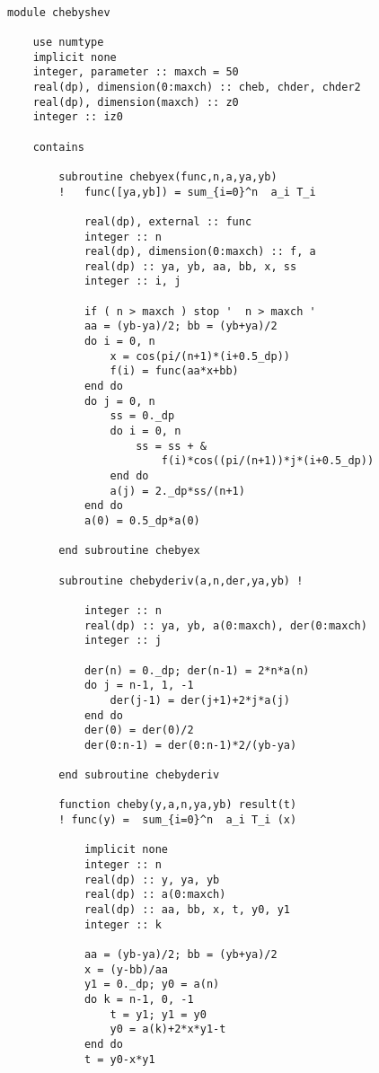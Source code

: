 \documentclass[12pt]{article}
\begin{document}
\begin{lstlisting}[frame=single,caption={{\tt cheby.f90}},label=cheby]

module chebyshev

	use numtype
	implicit none
	integer, parameter :: maxch = 50
	real(dp), dimension(0:maxch) :: cheb, chder, chder2
	real(dp), dimension(maxch) :: z0
	integer :: iz0
	
	contains
        
        subroutine chebyex(func,n,a,ya,yb) 
        !   func([ya,yb]) = sum_{i=0}^n  a_i T_i
    
            real(dp), external :: func
            integer :: n
            real(dp), dimension(0:maxch) :: f, a
            real(dp) :: ya, yb, aa, bb, x, ss
            integer :: i, j
    
            if ( n > maxch ) stop '  n > maxch '
            aa = (yb-ya)/2; bb = (yb+ya)/2
            do i = 0, n
                x = cos(pi/(n+1)*(i+0.5_dp))
                f(i) = func(aa*x+bb)
            end do
            do j = 0, n
                ss = 0._dp
                do i = 0, n
                    ss = ss + &
                        f(i)*cos((pi/(n+1))*j*(i+0.5_dp))
                end do
                a(j) = 2._dp*ss/(n+1)
            end do
            a(0) = 0.5_dp*a(0)
            
        end subroutine chebyex
      
        subroutine chebyderiv(a,n,der,ya,yb) ! 

            integer :: n
            real(dp) :: ya, yb, a(0:maxch), der(0:maxch)
            integer :: j
    
            der(n) = 0._dp; der(n-1) = 2*n*a(n)
            do j = n-1, 1, -1
                der(j-1) = der(j+1)+2*j*a(j)
            end do
            der(0) = der(0)/2
            der(0:n-1) = der(0:n-1)*2/(yb-ya)

        end subroutine chebyderiv
      
        function cheby(y,a,n,ya,yb) result(t) 
        ! func(y) =  sum_{i=0}^n  a_i T_i (x)

            implicit none
            integer :: n
            real(dp) :: y, ya, yb
            real(dp) :: a(0:maxch)
            real(dp) :: aa, bb, x, t, y0, y1
            integer :: k
    
            aa = (yb-ya)/2; bb = (yb+ya)/2
            x = (y-bb)/aa
            y1 = 0._dp; y0 = a(n)
            do k = n-1, 0, -1
                t = y1; y1 = y0
                y0 = a(k)+2*x*y1-t
            end do
            t = y0-x*y1


\end{lstlisting}
\end{document}
